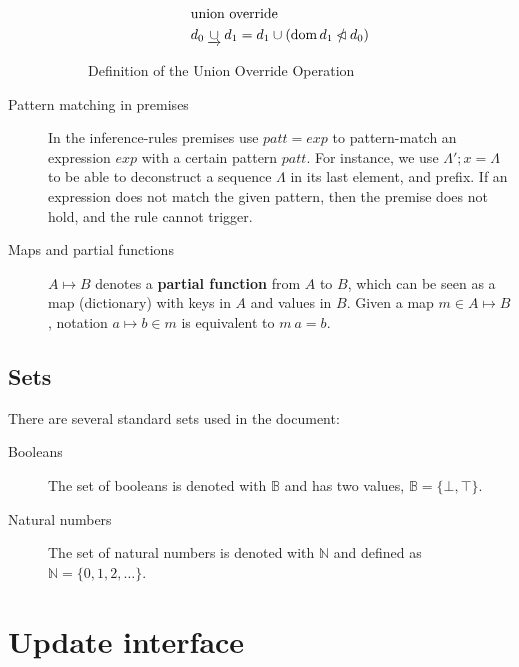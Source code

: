 \documentclass[11pt,a4paper]{article}
\DeclareMathOperator{\dom}{dom}
\newcommand{\restrictdom}{\lhd}
\newcommand{\subtractdom}{\mathbin{\slashed{\restrictdom}}}
\newcommand{\unionoverride}{\mathbin{\underrightarrow\cup}}
\newcommand{\var}[1]{\mathit{#1}}
\newcommand{\fun}[1]{\mathsf{#1}}
\newcommand{\type}[1]{\mathsf{#1}}
\begin{document}
\begin{description}
\begin{figure}
\begin{align*}
      & \text{union override}\\
      & d_0 \unionoverride d_1 = d_1 \cup (\dom d_1 \subtractdom d_0)
    \end{align*}
    \caption{Definition of the Union Override Operation}
    \label{fig:unionoverride}
  \end{figure}
\item[Pattern matching in premises] In the inference-rules premises use
  $\var{patt} = \var{exp}$ to pattern-match an expression $\var{exp} $ with a
  certain pattern $\var{patt}$. For instance, we use $\Lambda'; x = \Lambda$ to
  be able to deconstruct a sequence $\Lambda$ in its last element, and prefix.
  If an expression does not match the given pattern, then the premise does not
  hold, and the rule cannot trigger.
\item[Maps and partial functions] $A \mapsto B$ denotes a \textbf{partial
    function} from $A$ to $B$, which can be seen as a map (dictionary) with
  keys in $A$ and values in $B$. Given a map $m \in A \mapsto B$, notation
  $a \mapsto b \in m$ is equivalent to $m~ a = b$.
\end{description}

\subsection{Sets}
\label{sec:sets}

There are several standard sets used in the document:
%
\begin{description}
\item[Booleans] The set of booleans is denoted with $\mathbb{B}$ and has two
  values, $\mathbb{B} = \{\bot, \top\}$.
\item[Natural numbers] The set of natural numbers is denoted with
  $\mathbb{N}$ and defined as $\mathbb{N} = \{0, 1, 2, \dots\}$.
\end{description}

\section{Update interface}

\newcommand{\bupdprop}[1]{\fun{bUpdProp}\ #1}
\newcommand{\bupdvotes}[1]{\fun{bUpdVotes}\ #1}
\newcommand{\bprotver}[1]{\fun{bProtVer}\ #1}
\newcommand{\bendorsment}[1]{\fun{bEndorsment}\ #1}

\newcommand{\UpdatePayload}{\type{UpdatePayload}}

\newcommand{\UPIEnv}{\type{UPIEnv}}
\newcommand{\UPIState}{\type{UPIState}}
\newcommand{\UProp}{\type{UProp}}
\newcommand{\Vote}{\ensuremath{\type{Vote}}}
\newcommand{\ProtVer}{\ensuremath{\type{ProtVer}}}
\end{document}
